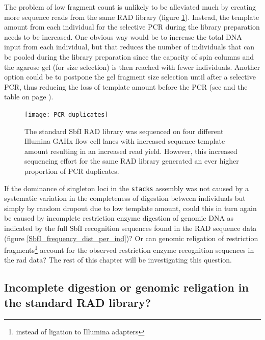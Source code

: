 \documentclass[a4paper,12pt,times,print,index,custombib,custommargin]{PhDThesisPSnPDF}\usepackage[]{graphicx}\usepackage[]{color}
\begin{document}
The problem of low \gls{fragment} count is unlikely to be alleviated much by creating more sequence reads from the same RAD library (figure \ref{PCRduplicates}). Instead, the template amount from each individual for the selective PCR during the library preparation needs to be increased. One obvious way would be to increase the total DNA input from each individual, but that reduces the number of individuals that can be pooled during the library preparation since the capacity of spin columns and the agarose gel (for size selection) is then reached with fewer individuals. Another option could be to postpone the gel fragment size selection until after a selective PCR, thus reducing the loss of template amount before the PCR (see \citealt{Parchman2012} and the table on page \pageref{compProt}).
%
\begin{figure}
\centering
\texttt{[image: PCR\_duplicates]}
\caption{The standard SbfI RAD library was sequenced on four different Illumina GAIIx flow cell lanes with increased sequence template amount resulting in an increased read yield. However, this increased sequencing effort for the same RAD library generated an ever higher proportion of PCR duplicates.}
\label{PCRduplicates}
\end{figure}

If the dominance of singleton loci in the \texttt{stacks} assembly was not caused by a systematic variation in the completeness of digestion between individuals but simply by random dropout due to low template amount, could this in turn again be caused by incomplete restriction enzyme digestion of genomic DNA as indicated by the full \gls{SbfI} recognition sequences found in the RAD sequence data (figure \ref{SbfI_frequency_dist_per_ind})? Or can genomic religation of restriction fragments\footnote{instead of ligation to Illumina adapters} account for the observed restriction enzyme recognition sequences in the \gls{rad} data?  The rest of this chapter will be investigating this question.


\FloatBarrier
\subsection{Incomplete digestion or genomic religation in the standard RAD library?}
\end{document}
